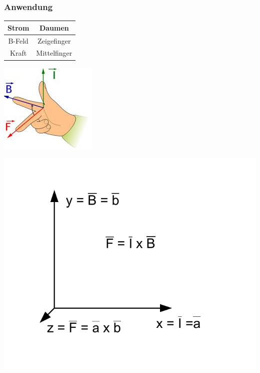 \documentclass[a4paper]{scrartcl}
\begin{document}
\subsubsection{Anwendung}

\begin{center}
\begin{tabular}{|c|c|}

\hline Strom & Daumen \\ 
\hline B-Feld & Zeigefinger \\ 
\hline Kraft & Mittelfinger \\ 
\hline 

\end{tabular} 
\end{center}


\begin{center}
\includegraphics[scale=0.5]{images/handregel.jpg}
\end{center}

\begin{center}
\includegraphics[scale=0.5]{images/kreuzprodukt.pdf}
\label{fig:kreuzprodukt}
\end{center}
\end{document}
